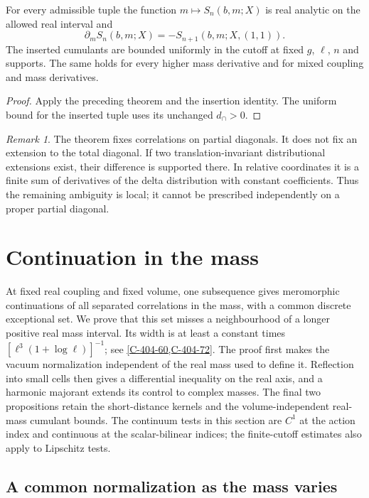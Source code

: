 \documentclass[11pt,letterpaper,reqno]{amsart}
\makeatletter
\theoremstyle{definition}
\newcommand{\ms@majorstart}{%
  \pushQED{\qed}\renewcommand{\qedsymbol}{$\blacksquare\square$}}
\newenvironment{corollary}[1][]{\ms@majorstart\ms@corollary[#1]}
  {\popQED\endms@corollary}
\theoremstyle{remark}
\newtheorem{remark}[ms@proposition]{Remark}
\makeatother
\begin{document}
\begin{corollary}[Mass differentiation]\label{C-412-36}
For every admissible tuple the function $m\mapsto S_n(b,m;X)$
is real analytic on the allowed real interval and
\[
 \partial_m S_n(b,m;X)=-S_{n+1}(b,m;X,(1,1)).
\]
The inserted cumulants are bounded uniformly in the cutoff
at fixed $g$, $\ell$, $n$ and supports. The same holds for
every higher mass derivative and for mixed coupling and mass
derivatives.
\end{corollary}
\begin{proof}
Apply the preceding theorem and the insertion identity. The
uniform bound for the inserted tuple uses its unchanged
$d_\cap>0$.
\end{proof}

\begin{remark}\label{rem:qcdm2-total-diagonal}
The theorem fixes correlations on partial diagonals. It does
not fix an extension to the total diagonal. If two
translation-invariant distributional extensions exist, their
difference is supported there. In relative coordinates it is
a finite sum of derivatives of the delta distribution with
constant coefficients. Thus the remaining ambiguity is local;
it cannot be prescribed independently on a proper partial
diagonal.
\end{remark}

\section{Continuation in the mass}\label{sec:qcdm2-mass-continuation}

At fixed real coupling and fixed volume, one subsequence gives
meromorphic continuations of all separated correlations in
the mass, with a common discrete exceptional set. We prove
that this set misses a neighbourhood of a longer positive
real mass interval. Its width is at least a constant times
$[\ell^3(1+\log\ell)]^{-1}$; see \cref{C-404-60,C-404-72}.
The proof first makes the vacuum normalization independent of
the real mass used to define it. Reflection into small cells
then gives a differential inequality on the real axis, and
a harmonic majorant extends its control to complex masses.
The final two propositions retain the short-distance kernels
and the volume-independent real-mass cumulant bounds.
The continuum tests in this section are $C^1$ at the action
index and continuous at the scalar-bilinear indices; the
finite-cutoff estimates also apply to Lipschitz tests.

\subsection{A common normalization as the mass varies}
\end{document}
